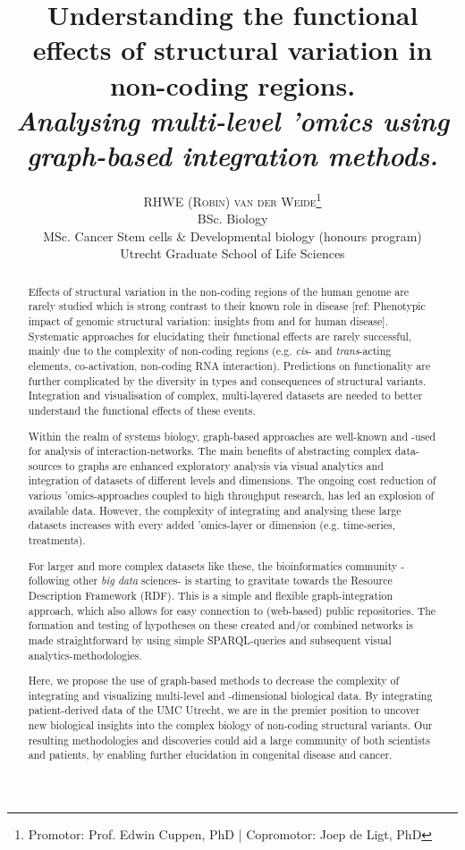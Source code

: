 \documentclass[twoside,fontsize=12pt]{article}
\title{\vspace{-15mm}\fontsize{18pt}{10pt}\normalfont\textbf{Understanding the functional effects of structural variation in non-coding regions.\\ \vspace{4 mm} {{\footnotesize \textit{Analysing multi-level 'omics using graph-based integration methods.}}}}} %
\author{
\large
\textsc {RHWE (Robin) van der Weide}\thanks{Promotor: Prof. Edwin Cuppen, PhD | Copromotor: Joep de Ligt, PhD}\\[2mm] 
\normalsize  BSc. Biology\\
\normalsize  MSc. Cancer Stem cells \& Developmental biology (honours program)\\
\normalsize  Utrecht Graduate School of Life Sciences \\
\vspace{-5mm}
}
\date{}
\renewcommand{\abstractname}{}    %
\begin{document}
\maketitle %

\thispagestyle{fancy} %

\newpage
\renewcommand{\abstractname}{\begin{center}
Summary of the research
\end{center}}    %

\begin{abstract}
\noindent
Effects of structural variation in the non-coding regions of the human genome are rarely studied which is strong contrast to their known role in disease [ref: Phenotypic impact of genomic structural variation: insights from and for human disease]. Systematic approaches for elucidating their functional effects are rarely successful, mainly due to the complexity of non-coding regions (e.g. \textit{cis}- and \textit{trans}-acting elements, co-activation, non-coding RNA interaction). Predictions on functionality are further complicated by the diversity in types and consequences of structural variants. Integration and visualisation of complex, multi-layered datasets are needed to better understand the functional effects of these events\cite{Munoz2011}.
\medskip

\noindent 
Within the realm of systems biology, graph-based approaches are well-known and -used for analysis of interaction-networks. The main benefits of abstracting complex data-sources to graphs are enhanced exploratory analysis via visual analytics and integration of datasets of different levels and dimensions. The ongoing cost reduction of various 'omics-approaches coupled to high throughput research, has led an explosion of available data. However, the complexity of integrating and analysing these large datasets increases with every added 'omics-layer or dimension (e.g. time-series, treatments). 

For larger and more complex datasets like these, the bioinformatics community -following other \textit{big data} sciences- is starting to gravitate towards the Resource Description Framework (RDF). This is a simple and flexible graph-integration approach, which also allows for easy connection to (web-based) public repositories. The formation and testing of hypotheses on these created and/or combined networks is made straightforward by using simple SPARQL-queries and subsequent visual analytics-methodologies.
\medskip

\noindent Here, we propose the use of graph-based methods to decrease the complexity of integrating and visualizing multi-level and -dimensional biological data. By integrating patient-derived data of the UMC Utrecht, we are in the premier position to uncover new biological insights into the complex biology of non-coding structural variants. Our resulting methodologies and discoveries could aid a large community of both scientists and patients, by enabling further elucidation in congenital disease and cancer. 
\end{abstract}
\medskip
\end{document}
